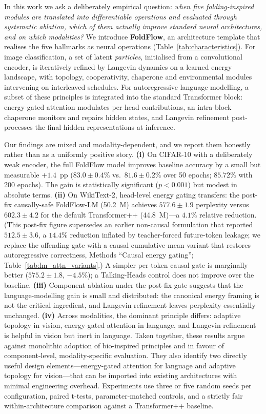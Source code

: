 \documentclass[fleqn,10pt]{article}
\begin{document}
In this work we ask a deliberately empirical question: \emph{when
five folding-inspired modules are translated into differentiable
operations and evaluated through systematic ablation, which of them
actually improve standard neural architectures, and on which
modalities?} We introduce \textbf{FoldFlow}, an architecture template
that realises the five hallmarks as neural operations
(Table~\ref{tab:characteristics}). For image classification, a set
of latent \emph{particles}, initialised from a convolutional encoder,
is iteratively refined by Langevin dynamics on a learned energy
landscape, with topology, cooperativity, chaperone and environmental
modules intervening on interleaved schedules. For autoregressive
language modelling, a subset of these principles is integrated into
the standard Transformer block: energy-gated attention modulates
per-head contributions, an intra-block chaperone monitors and
repairs hidden states, and Langevin refinement post-processes the
final hidden representations at inference.

Our findings are mixed and modality-dependent, and we report them
honestly rather than as a uniformly positive story. \textbf{(i)} On
CIFAR-10 with a deliberately weak encoder, the full FoldFlow model
improves baseline accuracy by a small but measurable $+1.4$~pp
($83.0 \pm 0.4$\% vs.\ $81.6 \pm 0.2$\% over 50 epochs;
$85.72$\% with 200 epochs). The gain is statistically significant
($p<0.001$) but modest in absolute terms. \textbf{(ii)} On
WikiText-2, head-level energy gating transfers: the post-fix
causally-safe FoldFlow-LM (50.2~M) achieves
$577.6 \pm 1.9$ perplexity versus $602.3 \pm 4.2$ for the default
Transformer++ (44.8~M)---a $4.1\%$ relative reduction. (This
post-fix figure supersedes an earlier non-causal formulation that
reported $512.5 \pm 3.6$, a $14.4\%$ reduction inflated by
teacher-forced future-token leakage; we replace the offending gate
with a causal cumulative-mean variant that restores autoregressive
correctness, Methods ``Causal energy gating'';
Table~\ref{tab:lm_attn_variants}.)
A simpler per-token causal gate is marginally better
($575.2 \pm 1.8$, $-4.5\%$); a Talking-Heads control does not improve
over the baseline. \textbf{(iii)} Component ablation under the
post-fix gate suggests that the language-modelling gain is small and
distributed: the canonical energy framing is not the critical
ingredient, and Langevin refinement leaves perplexity essentially
unchanged. \textbf{(iv)} Across modalities, the dominant principle
differs: adaptive topology in vision, energy-gated attention in
language, and Langevin refinement is helpful in vision but inert
in language. Taken together, these results argue against monolithic
adoption of bio-inspired principles and in favour of
component-level, modality-specific evaluation. They also identify
two directly useful design elements---energy-gated attention for
language and adaptive topology for vision---that can be imported
into existing architectures with minimal engineering overhead.
Experiments use three or five random seeds per configuration,
paired t-tests, parameter-matched controls, and a strictly fair
within-architecture comparison against a
Transformer++\cite{vaswani2017attention,ba2016layer,shazeer2020glu}
baseline.
\end{document}
